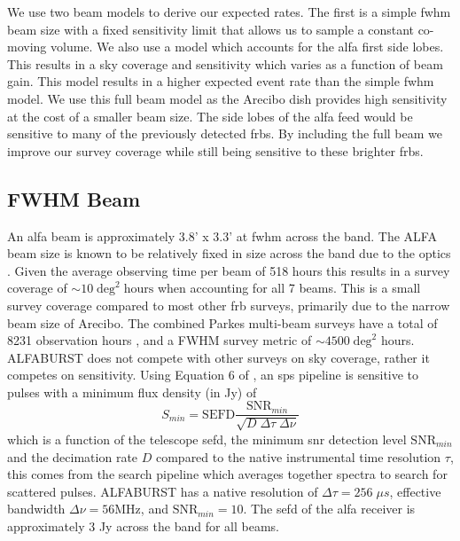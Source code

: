 \documentclass[a4paper,fleqn,usenatbib]{mnras}
\begin{document}
We use two beam models to derive our expected rates. The first is a simple
\gls{fwhm} beam size with a fixed sensitivity limit that allows us to sample a
constant co-moving volume. We also use a model which accounts for the \gls{alfa}
first side lobes. This results in a sky coverage and sensitivity which varies as
a function of beam gain. This model results in a higher expected event rate than
the simple \gls{fwhm} model. We use this full beam model as the Arecibo dish
provides high sensitivity at the cost of a smaller beam size. The side lobes of
the \gls{alfa} feed would be sensitive to many of the previously detected
\glspl{frb}. By including the full beam we improve our survey coverage while
still being sensitive to these brighter \glspl{frb}.

\subsection{FWHM Beam}
\label{sec:fwhm_beam_rates}

An \gls{alfa} beam is approximately 3.8' x 3.3' at \gls{fwhm} across the band.
The ALFA beam size is known to be relatively fixed in size across the band due
to the optics \citep{GALFAbeam}.  Given the average observing time per beam of
518 hours this results in a survey coverage of $\sim 10 \; \textrm{deg}^2 \;
\textrm{hours}$ when accounting for all 7 beams. This is a small survey coverage
compared to most other \gls{frb} surveys, primarily due to the narrow beam size
of Arecibo. The combined Parkes multi-beam surveys have a total of 8231
observation hours \citep{2016MNRAS.460.3370C}, and a FWHM survey metric of $\sim
4500 \; \textrm{deg}^2$ hours.  ALFABURST does not compete with other surveys on
sky coverage, rather it competes on sensitivity.  Using Equation 6 of
\cite{2015MNRAS.452.1254K}, an \gls{sps} pipeline is sensitive to pulses with a
minimum flux density (in Jy) of
%
\begin{equation}
S_{min} = \textrm{SEFD} \frac{\textrm{SNR}_{min}}{\sqrt{D \; \Delta \tau \;
\Delta \nu}}
\end{equation}
%
which is a function of the telescope \gls{sefd}, the minimum \gls{snr}
detection level $\textrm{SNR}_{min}$ and the decimation rate $D$ compared to the
native instrumental time resolution $\tau$, this comes from the search pipeline
which averages together spectra to search for scattered pulses. ALFABURST has a
native resolution of $\Delta \tau = 256 \; \mu s$, effective bandwidth $\Delta
\nu = 56 \textrm{MHz}$, and $\textrm{SNR}_{min} = 10$. The \gls{sefd} of the
\gls{alfa} receiver is approximately 3 Jy across the band for all beams.
\end{document}
